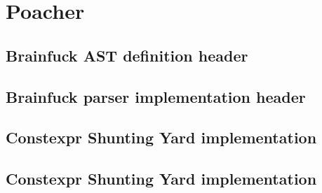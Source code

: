 \documentclass[../main]{subfiles}
\begin{document}
\section{
  Poacher
}

\subsection{
  Brainfuck AST definition header
}
\label{app:bf-ast}



\clearpage{} %

\subsection{
  Brainfuck parser implementation header
}
\label{app:bf-parser}



\clearpage{} %

\subsection{
  Constexpr Shunting Yard implementation
}
\label{app:shunting-yard-impl}



\clearpage{} %

\subsection{
  Constexpr Shunting Yard implementation
}
\label{app:tml-impl}


\end{document}
